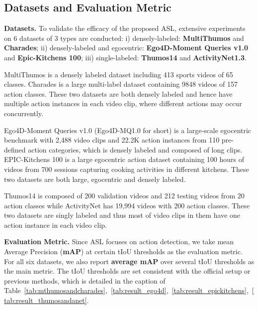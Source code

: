 \documentclass[10pt,twocolumn,letterpaper]{article}
\begin{document}
\subsection{Datasets and Evaluation Metric}
\textbf{Datasets.}
To validate the efficacy of the proposed ASL, extensive experiments on 6 datasets of 3 types are conducted: i) densely-labeled: \textbf{MultiThumos}\cite{multithumos} and \textbf{Charades}\cite{charades}; ii) densely-labeled and egocentric: \textbf{Ego4D-Moment Queries v1.0}\cite{grauman2022ego4d} and \textbf{Epic-Kitchens 100}\cite{Damen2018EPICKITCHENS}; iii) single-labeled: \textbf{Thumos14}\cite{thumos} and \textbf{ActivityNet1.3}\cite{caba2015activitynet}. 
\par MultiThumos is a densely labeled dataset including 413 sports videos of 65 classes.  Charades is a large multi-label dataset containing 9848 videos of 157 action classes. These two datasets are both densely labeled and hence have multiple action instances in each video clip, where different actions may occur concurrently.
\par Ego4D-Moment Queries v1.0 (Ego4D-MQ1.0 for short) is a large-scale egocentric benchmark with 2,488 video clips and 22.2K action instances from 110 pre-defined action categories, which is densely labeled and composed of long clips. EPIC-Kitchens 100 is a large egocentric action dataset containing 100 hours of videos from 700 sessions capturing cooking activities in different kitchens. These two datasets are both large, egocentric and densely labeled.
\par Thumos14 is composed of 200 validation videos and 212 testing videos from 20 action classes while ActivityNet has 19,994 videos with 200 action classes. These two datasets are singly labeled and thus most of video clips in them have one action instance in each video clip.

 \textbf{Evaluation Metric.} 
Since ASL focuses on action detection, we take mean Average Precision (\textbf{mAP})
at certain tIoU thresholds as the evaluation metric. For all six datasets, we also report \textbf{average mAP} over several tIoU thresholds as the main metric.  The tIoU thresholds are set consistent with the official setup or previous methods, which is detailed in the caption of Table~\ref{tab:mthumosandcharades},~\ref{tab:result_ego4d},~\ref{tab:result_epickitchens},~\ref{tab:result_thumosandanet}.
\end{document}
